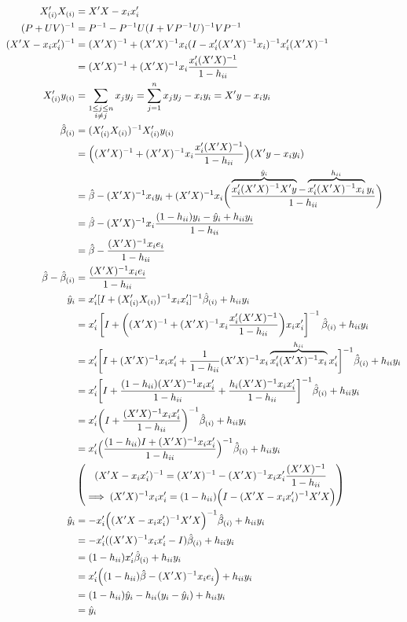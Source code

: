 \documentclass[executivepaper,leqno]{amsart}
\begin{document}
\begin{align*}
    X_{(i)}'X_{(i)} &= X'X - x_ix_i'\\
    (P+UV)^{-1} &= P^{-1}-P^{-1}U(I+VP^{-1}U)^{-1}VP^{-1}\\
    (X'X - x_ix_i')^{-1} &= (X'X)^{-1} + (X'X)^{-1}x_i(I -
    x_i'(X'X)^{-1}x_i)^{-1}x_i'(X'X)^{-1}\\
    &= (X'X)^{-1} + (X'X)^{-1}x_i\frac{x_i'(X'X)^{-1}}{1-h_{ii}}\\
    X_{(i)}'y_{(i)} &= \sum_{\substack{1\leq j \leq n\\i \ne j}} x_jy_j
        = \sum_{j=1}^n x_jy_j - x_iy_i = X'y - x_iy_i\\
    \hat\beta_{(i)} &= (X_{(i)}'X_{(i)})^{-1}X_{(i)}'y_{(i)}\\
    &= \Bigl((X'X)^{-1} + (X'X)^{-1}x_i\frac{x_i'(X'X)^{-1}}{1-h_{ii}}\Bigr)(X'y-x_iy_i)\\
    &= \hat\beta - (X'X)^{-1}x_iy_i + (X'X)^{-1}x_i\biggl(
    \frac{\overbrace{x_i'(X'X)^{-1}X'y}^{\hat y_i} -
    \overbrace{x_i'(X'X)^{-1}x_i}^{h_{ii}}y_i}{1-h_{ii}}\biggr)\\
    &= \hat\beta - (X'X)^{-1}x_i\frac{(1-h_{ii})y_i - \hat y_i + h_{ii}y_i}{1-h_{ii}}\\
    &= \hat\beta -\frac{(X'X)^{-1}x_ie_i}{1-h_{ii}}\\
    \hat\beta-\hat\beta_{(i)} &= \frac{(X'X)^{-1}x_ie_i}{1-h_{ii}}\\
    \hat y_i &= x_i'[I + (X_{(i)}'X_{(i)})^{-1}x_ix_i']^{-1}\hat\beta_{(i)}+h_{ii}y_i\\
    &= x_i'\left[I+\biggl((X'X)^{-1}+(X'X)^{-1}x_i\frac{x_i'(X'X)^{-1}}{1-h_{ii}}\biggr)x_ix_i'\right]^{-1}\hat\beta_{(i)} + h_{ii}y_i\\
    &= x_i'\biggl[I+(X'X)^{-1}x_ix_i' + \frac1{1-h_{ii}}(X'X)^{-1}x_i\overbrace{x_i'(X'X)^{-1}x_i}^{h_{ii}}x_i'\biggr]^{-1}\hat\beta_{(i)}+h_{ii}y_i\\
    &= x_i'\biggl[I+\frac{(1-h_{ii})(X'X)^{-1}x_ix_i'}{1-h_{ii}}+\frac{h_i(X'X)^{-1}x_ix_i'}{1-h_{ii}}\biggr]^{-1}\hat\beta_{(i)} +h_{ii}y_i\\
    &=
    x_i'\biggl(I+\frac{(X'X)^{-1}x_ix_i'}{1-h_{ii}}\biggr)^{-1}\hat\beta_{(i)} + h_{ii}y_i\\
    &= x_i'\Bigl(\frac{(1-h_{ii})I+(X'X)^{-1}x_ix_i'}{1-h_{ii}}\Bigr)^{-1}\hat\beta_{(i)} + h_{ii}y_i\\
    &\left(\substack{
        \displaystyle (X'X-x_ix_i')^{-1} = (X'X)^{-1} - (X'X)^{-1}x_ix_i'\frac{(X'X)^{-1}}{1-h_{ii}}\\
        \displaystyle\implies (X'X)^{-1}x_ix_i' =(1-h_{ii})\Bigl(I-(X'X-x_ix_i')^{-1}X'X\Bigr)
    }\right)\\
    \hat y_i &= -x_i'\Bigl((X'X-x_ix_i')^{-1}X'X\Bigr)^{-1}\hat\beta_{(i)} +
    h_{ii}y_i\\
    &= -x_i'((X'X)^{-1}x_ix_i'-I)\hat\beta_{(i)}+h_{ii}y_i\\
    &= (1-h_{ii})x_i'\hat\beta_{(i)}+h_{ii}y_i\\
    &= x_i'\Bigl((1-h_{ii})\hat\beta-(X'X)^{-1}x_ie_i\Bigr)+h_{ii}y_i\\
    &= (1-h_{ii})\hat y_i - h_{ii}(y_i-\hat y_i) + h_{ii}y_i\\
    &= \hat y_i
\end{align*}
\end{document}
